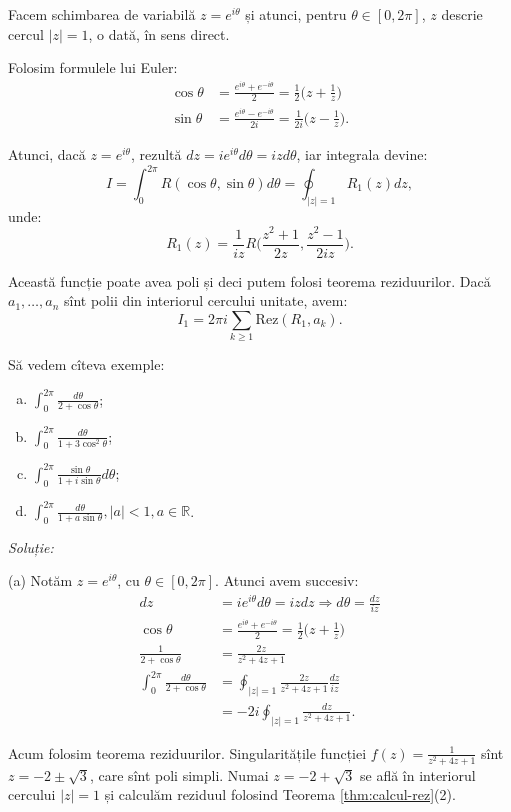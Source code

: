 \documentclass[12pt,a4paper]{article}
\newcommand\ds{\displaystyle}
\newcommand\RR{\mathbb{R}}
\newcommand\Rez{\mathrm{Rez}}
\theoremstyle{dotless}
\theoremstyle{dotlessdr}
\begin{document}
Facem schimbarea de variabilă $ z = e^{i\theta} $ și atunci, pentru $ \theta \in [0, 2\pi] $,
$ z $ descrie cercul $ |z| = 1 $, o dată, în sens direct.

Folosim formulele lui Euler:
\begin{align*}
  \cos \theta &= \frac{e^{i\theta} + e^{-i\theta}}{2} = \frac{1}{2} \Big( z + \frac{1}{z} \Big) \\
  \sin \theta &= \frac{e^{i\theta} - e^{-i\theta}}{2i} = \frac{1}{2i} \Big( z - \frac{1}{z} \Big).
\end{align*}

Atunci, dacă $ z = e^{i\theta} $, rezultă $ dz = ie^{i\theta} d\theta = izd\theta $,
iar integrala devine:
\[
  I = \int_0^{2 \pi} R(\cos \theta, \sin \theta) d\theta = \oint_{|z| = 1} R_1(z) dz,
\]
unde:
\[
  R_1(z) = \frac{1}{iz} R\Big( \frac{z^2 + 1}{2z}, \frac{z^2 - 1}{2iz} \Big).
\]

Această funcție poate avea poli și deci putem folosi teorema reziduurilor. Dacă
$ a_1, \dots, a_n $ sînt polii din interiorul cercului unitate, avem:
\[
  I_1 = 2 \pi i \sum_{k \geq 1} \Rez(R_1, a_k).
\]

\vspace{1cm}

Să vedem cîteva exemple:
\begin{enumerate}[(a)]
\item $ \ds\int_0^{2 \pi} \frac{d\theta}{2 + \cos \theta} $;
\item $ \ds\int_0^{2 \pi} \frac{d\theta}{1 + 3 \cos^2 \theta} $;
\item $ \ds\int_0^{2 \pi} \frac{\sin \theta}{1 + i \sin \theta} d\theta $;
\item $ \ds\int_0^{2 \pi} \frac{d\theta}{1 + a \sin \theta}, |a| < 1, a \in \RR $.
\end{enumerate}

\emph{Soluție:}

(a) Notăm $ z = e^{i\theta} $, cu $ \theta \in [0, 2\pi] $. Atunci avem succesiv:
\begin{align*}
  dz &= ie^{i\theta} d\theta = izdz \Rightarrow d\theta = \frac{dz}{iz} \\
  \cos \theta &= \frac{e^{i\theta} + e^{-i\theta}}{2} = \frac{1}{2} \Big( z + \frac{1}{z} \Big) \\
  \frac{1}{2 + \cos \theta} &= \frac{2z}{z^2 + 4z + 1} \\
  \int_0^{2 \pi} \frac{d\theta}{2 + \cos \theta} &= \oint_{|z| = 1} \frac{2z}{z^2 + 4z + 1} \frac{dz}{iz} \\
     &= -2i \oint_{|z| = 1} \frac{dz}{z^2 + 4z + 1}.
\end{align*}

Acum folosim teorema reziduurilor. Singularitățile funcției $ f(z) = \frac{1}{z^2 + 4z + 1} $
sînt $ z = -2 \pm \sqrt{3} $, care sînt poli simpli. Numai $ z = -2 + \sqrt{3} $ se află
în interiorul cercului $ |z| = 1 $ și calculăm reziduul folosind
Teorema \ref{thm:calcul-rez}(2).
\end{document}
